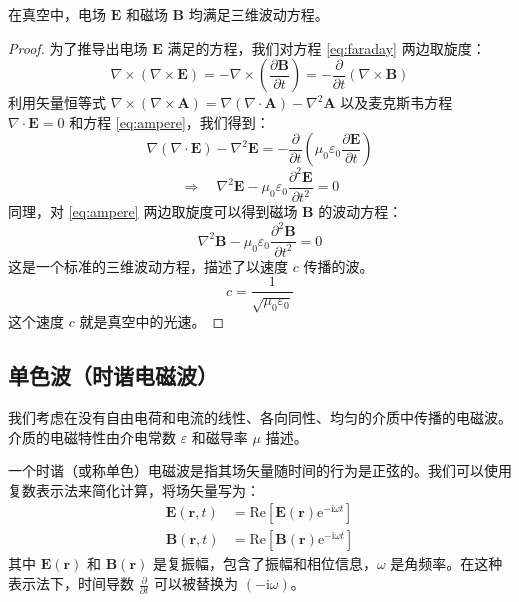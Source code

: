 \documentclass[fontset=none]{ctexart}
\begin{document}
\begin{proposition}[电磁波的波动方程]
在真空中，电场 $\bm{E}$ 和磁场 $\bm{B}$ 均满足三维波动方程。
\end{proposition}

\begin{proof}
为了推导出电场 $\bm{E}$ 满足的方程，我们对方程 \eqref{eq:faraday} 两边取旋度：
\begin{equation}
\nabla \times (\nabla \times \bm{E}) = -\nabla \times \left(\frac{\partial \bm{B}}{\partial t}\right) = -\frac{\partial}{\partial t}(\nabla \times \bm{B})
\end{equation}
利用矢量恒等式 $\nabla \times (\nabla \times \bm{A}) = \nabla(\nabla \cdot \bm{A}) - \nabla^2 \bm{A}$ 以及麦克斯韦方程 $\nabla \cdot \bm{E} = 0$ 和方程 \eqref{eq:ampere}，我们得到：
\begin{equation}
\nabla(\nabla \cdot \bm{E}) - \nabla^2 \bm{E} = -\frac{\partial}{\partial t}\left(\mu_0 \varepsilon_0 \frac{\partial \bm{E}}{\partial t}\right)
\end{equation}
\begin{equation}
\Rightarrow \quad \nabla^2 \bm{E} - \mu_0 \varepsilon_0 \frac{\partial^2 \bm{E}}{\partial t^2} = 0
\end{equation}
同理，对 \eqref{eq:ampere} 两边取旋度可以得到磁场 $\bm{B}$ 的波动方程：
\begin{equation}
\nabla^2 \bm{B} - \mu_0 \varepsilon_0 \frac{\partial^2 \bm{B}}{\partial t^2} = 0
\end{equation}
这是一个标准的三维波动方程，描述了以速度 $c$ 传播的波。
\begin{equation}
c = \frac{1}{\sqrt{\mu_0 \varepsilon_0}}
\end{equation}
这个速度 $c$ 就是真空中的光速。
\end{proof}

\subsection{单色波（时谐电磁波）}
我们考虑在没有自由电荷和电流的线性、各向同性、均匀的介质中传播的电磁波。介质的电磁特性由介电常数 $\varepsilon$ 和磁导率 $\mu$ 描述。

\begin{definition}[时谐场]
一个时谐（或称单色）电磁波是指其场矢量随时间的行为是正弦的。我们可以使用复数表示法来简化计算，将场矢量写为：
\begin{equation}
\begin{aligned}
\bm{E}(\bm{r}, t) &= \mathrm{Re}[\bm{E}(\bm{r}) \mathrm{e}^{-\mathrm{i}\omega t}] \\
\bm{B}(\bm{r}, t) &= \mathrm{Re}[\bm{B}(\bm{r}) \mathrm{e}^{-\mathrm{i}\omega t}]
\end{aligned}
\end{equation}
其中 $\bm{E}(\bm{r})$ 和 $\bm{B}(\bm{r})$ 是复振幅，包含了振幅和相位信息，$\omega$ 是角频率。在这种表示法下，时间导数 $\frac{\partial}{\partial t}$ 可以被替换为 $(-\mathrm{i}\omega)$。
\end{definition}
\end{document}
